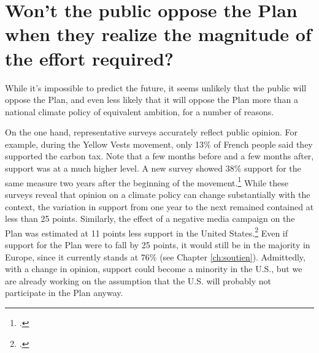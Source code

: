 \documentclass[a5paper,english,openany]{memoir}
\begin{document}
\section*{\normalsize Won't the public oppose the Plan when they realize the magnitude of the effort required?}\label{q:soutien}

While it's impossible to predict the future, it seems unlikely that the public will oppose the Plan, and even less likely that it will oppose the Plan more than a national climate policy of equivalent ambition, for a number of reasons. 

On the one hand, representative surveys accurately reflect public opinion. 
For example, during the Yellow Vests movement, 
only 13\% of French people said they supported the carbon tax. Note that a few months before and a few months after, support was at a much higher level. A new survey showed 38\% support for the same measure two years after the beginning of the movement.\footnote{\citet{douenne_les_2020}.} While these surveys reveal that opinion on a climate policy can change substantially with the context, the variation in support from one year to the next remained contained at less than 25 points. Similarly, the effect of a negative media campaign on the Plan was estimated at 11 points less support 
in the United States.\footnote{\citet{fabre_international_2023}.} Even if support for the Plan were to fall by 25 points, it would still be in the majority in Europe, since it currently stands at 76\% (see Chapter \ref{ch:soutien}). Admittedly, with a change in opinion, support could become a minority in the U.S., but we are already working on the assumption that the U.S. will probably not participate in the Plan anyway. %
\end{document}
